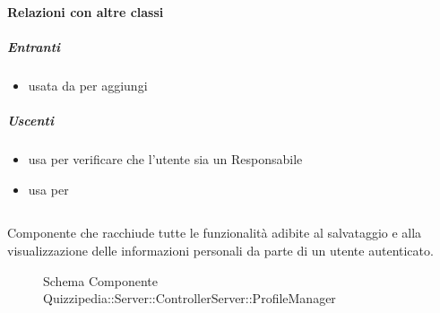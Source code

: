\paragraph{Relazioni con altre classi}
\subparagraph{Entranti}
\begin{itemize}
\item usata da  per aggiungi
\end{itemize}
\subparagraph{Uscenti}
\begin{itemize}
\item usa  per verificare che l'utente sia un Responsabile
\item usa  per 
\end{itemize}
\subsection{}
Componente che racchiude tutte le funzionalità adibite al salvataggio e alla visualizzazione delle informazioni personali da parte di un utente autenticato.
\begin{figure}[H]
\centering
\noindent{}
\caption[Schema Componente Quizzipedia::Server::ControllerServer::ProfileManager]{Schema Componente Quizzipedia::Server::ControllerServer::ProfileManager}
\end{figure}
